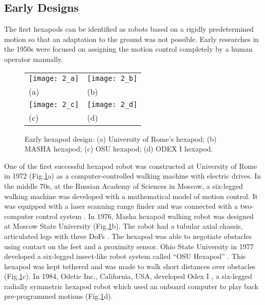 \subsection{Early Designs}
The first hexapods can be identified as robots based on a rigidly predetermined motion so that
an adaptation to the ground was not possible. Early researches in the 1950s were focused on assigning the motion control completely by a human operator manually\cite{11h}. 
\begin{figure}[h]
    \centering
    \begin{tabular}{ l l }
        \texttt{[image: 2\_a]} & \texttt{[image: 2\_b]} \\ 
        \hspace{3.5cm}(a) & \hspace{3.3cm}(b)\\
        \texttt{[image: 2\_c]} & \hspace{2cm} \texttt{[image: 2\_d]} \\ 
        \hspace{3.5cm}(c) & \hspace{3.3cm}(d)\\
    \end{tabular}
    \caption{Early hexapod design: (a) University of Rome’s hexapod; (b) MASHA hexapod; (c) OSU hexapod; (d) ODEX I hexapod.}
    \label{fig2}
\end{figure}

One of the first successful hexapod robot was constructed at University of Rome in 1972 (Fig.\ref{fig2}a) as a computer-controlled walking machine with electric drives\cite{12h}. In the middle 70s, at the Russian Academy of Sciences in Moscow, a six-legged walking machine was developed with a mathematical model of motion control. It was equipped with a laser scanning range finder and was connected with a two-computer control system \cite{13h}. In 1976, Masha hexapod walking robot was designed at Moscow State University (Fig.\ref{fig2}b). The robot had a tubular axial chassis, articulated legs with three DoFs \cite{14h}. The hexapod was able to negotiate obstacles using contact on the feet and a proximity sensor. Ohio State University in 1977 developed a six-legged insect-like robot system called “OSU Hexapod” \cite{15h}. This hexapod was kept tethered and was made to walk short distances over obstacles (Fig.\ref{fig2}c).
In 1984, Odetic Inc., California, USA, developed Odex I \cite{17h}, a six-legged radially symmetric hexapod robot which used an onboard computer to play back pre-programmed motions (Fig.\ref{fig2}d).


